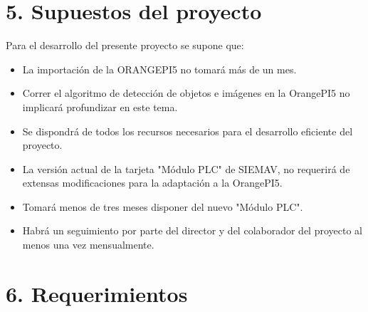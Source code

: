 \documentclass[
11pt, %
]{charter}
\begin{document}
\section{5. Supuestos del proyecto}
\label{sec:supuestos}


Para el desarrollo del presente proyecto se supone que:

\begin{itemize}
	\item La importación de la ORANGEPI5 no tomará más de un mes.
	\item Correr el algoritmo de detección de objetos e imágenes en la OrangePI5 no implicará profundizar en este tema.
	\item Se dispondrá de todos los recursos necesarios para el desarrollo eficiente del proyecto.
	\item La versión actual de la tarjeta "Módulo PLC"  de SIEMAV, no requerirá de extensas modificaciones para la adaptación a la OrangePI5.
	\item Tomará menos de tres meses disponer del nuevo "Módulo PLC".
	\item Habrá un seguimiento por parte del director y del colaborador del proyecto al menos una vez mensualmente.
\end{itemize}


\section{6. Requerimientos}
\label{sec:requerimientos}
\end{document}
